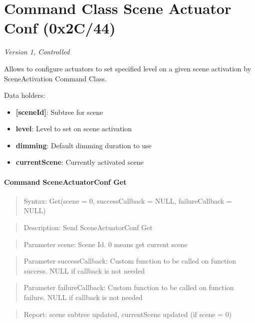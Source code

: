 \section{Command Class Scene Actuator Conf (0x2C/44)}

\textit{Version 1, Controlled}
\newline

Allows to configure actuators to set specified level on a given scene activation by SceneActivation Command Class.
\newline

\noindent
Data holders:

\begin{itemize}
\item \textbf{[sceneId]}: Subtree for scene
\item \qquad\textbf{level}: Level to set on scene activation
\item \qquad\textbf{dimming}: Default dimming duration to use
\item \textbf{currentScene}: Currently activated scene
\end{itemize}

\paragraph{Command SceneActuatorConf Get}
\begin{quote}Syntax: Get(scene = 0, successCallback = NULL, failureCallback = NULL)\end{quote}
\begin{quote}Description: Send SceneActuatorConf Get\end{quote}
\begin{quote}Parameter scene: Scene Id. 0 means get current scene\end{quote}
\begin{quote}Parameter successCallback: Custom function to be called on function success. NULL if callback is not needed\end{quote}
\begin{quote}Parameter failureCallback: Custom function to be called on function failure. NULL if callback is not needed\end{quote}
\begin{quote}Report: scene subtree updated, currentScene updated (if scene = 0)\end{quote}

